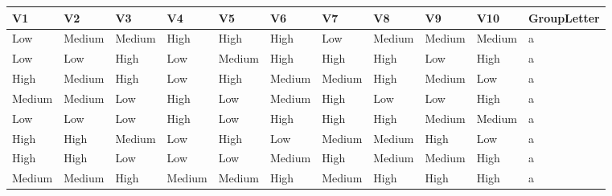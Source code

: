 \documentclass[water,article,submit,moreauthors,pdftex]{mdpi}
\begin{document}
\begin{table}[]
\tiny
\centering
\resizebox{13cm}{!} {
\begin{tabular}{@{}lllllllllll@{}}
\toprule
\textbf{V1}                  & \textbf{V2}                    & \textbf{V3}                  & \textbf{V4}                    & \textbf{V5}                  & \textbf{V6}                    & \textbf{V7}                    & \textbf{V8}                    & \textbf{V9}                    & \textbf{V10}                   & \textbf{GroupLetter}      \\ \midrule
Low      & Medium     & Medium                       & High                           & High                         & High                           & Low                            & Medium                         & Medium                         & Medium                         & a                         \\
Low                          & Low                            & High                         & Low                            & Medium                       & High                           & High                           & High                           & Low                            & High                           & a \\
High & Medium & High & Low    & High & Medium & Medium & High   & Medium & Low    & a                         \\
Medium                       & Medium                         & Low                          & High                           & Low                          & Medium                         & High                           & Low                            & Low                            & High                           & a \\
Low  & Low    & Low  & High   & Low  & High   & High   & High   & Medium & Medium & a                         \\
High                         & High                           & Medium                       & Low                            & High                         & Low                            & Medium                         & Medium                         & High                           & Low                            & a \\
High & High   & Low  & Low    & Low  & Medium & High   & Medium & Medium & High   & a                         \\
Medium                       & Medium                         & High                         & Medium                         & Medium                       & High                           & Medium                         & High                           & High                           & High                           & a \\

\end{tabular}}
\end{table}
\end{document}
